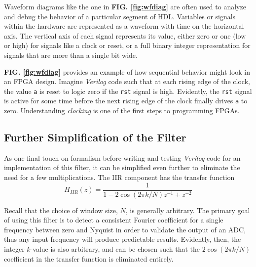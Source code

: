 \documentclass[reprint,amsmath,amssymb,aps,pra]{revtex4-2}
\begin{document}
Waveform diagrams like the one in \textbf{FIG. \ref{fig:wfdiag}} are often used to analyze and debug the behavior of a particular segment of HDL. Variables or signals within the hardware are represented as a waveform with time on the horizontal axis. The vertical axis of each signal represents its value, either zero or one (low or high) for signals like a clock or reset, or a full binary integer representation for signals that are more than a single bit wide. 

\textbf{FIG. \ref{fig:wfdiag}} provides an example of how sequential behavior might look in an FPGA design. Imagine \textit{Verilog} code such that at each rising edge of the clock, the value \verb+a+ is reset to logic zero if the \verb+rst+ signal is high. Evidently, the \verb+rst+ signal is active for some time before the next rising edge of the clock finally drives \verb+a+ to zero. Understanding \textit{clocking} is one of the first steps to programming FPGAs.

\subsection{Further Simplification of the Filter}

As one final touch on formalism before writing and testing \textit{Verilog} code for an implementation of this filter, it can be simplified even further to eliminate the need for a few multiplications. The IIR component has the transfer function
\begin{equation}
    H_{IIR}(z) = \frac{1}{1-2\cos(2\pi k/N)z^{-1} + z^{-2}}
\end{equation}

Recall that the choice of window size, $N$, is generally arbitrary. The primary goal of using this filter is to detect a consistent Fourier coefficient for a single frequency between zero and Nyquist in order to validate the output of an ADC, thus any input frequency will produce predictable results. Evidently, then, the integer $k$-value is also arbitrary, and can be chosen such that the $2\cos(2\pi k/N)$ coefficient in the transfer function is eliminated entirely.
\end{document}
